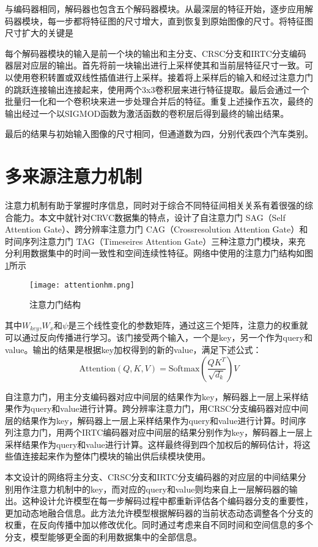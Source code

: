 与编码器相同，解码器也包含五个解码器模块。从最深层的特征开始，逐步应用解码器模块，每一步都将特征图的尺寸增大，直到恢复到原始图像的尺寸。将特征图尺寸扩大的关键是

每个解码器模块的输入是前一个块的输出和主分支、CRSC分支和IRTC分支编码器层对应层的输出。首先将前一块输出进行上采样使其和当前层特征尺寸一致。可以使用卷积转置或双线性插值进行上采样。接着将上采样后的输入和经过注意力门的跳跃连接输出连接起来，使用两个3x3卷积层来进行特征提取。最后会通过一个批量归一化和一个卷积块来进一步处理合并后的特征。重复上述操作五次，最终的输出经过一个以SIGMOD函数为激活函数的卷积层后得到最终的输出结果。

最后的结果与初始输入图像的尺寸相同，但通道数为四，分别代表四个汽车类别。

\section{多来源注意力机制}
注意力机制有助于掌握时序信息，同时对于综合不同特征间相关关系有着很强的综合能力。本文中就针对CRVC数据集的特点，设计了自注意力门 SAG（Self Attention Gate）、跨分辨率注意力门 CAG（Crossresolution Attention Gate）和时间序列注意力门 TAG（Timeseires Attention Gate）三种注意力门模块，来充分利用数据集中的时间一致性和空间连续性特征。网络中使用的注意力门结构如图\ref{fig:ag}所示
\begin{figure}[h]
    \centering
    \texttt{[image: attentionhm.png]}
    \caption{注意力门结构}
    \label{fig:ag}
  \end{figure}

其中\(W_{key}\),\(W_x\)和\(\psi\)是三个线性变化的参数矩阵，通过这三个矩阵，注意力的权重就可以通过反向传播进行学习。该门接受两个输入，一个是key，另一个作为query和value。输出的结果是根据key加权得到的新的value，满足下述公式：
\begin{equation}
\text{Attention}(Q, K, V) = \text{Softmax}\left(\frac{QK^T}{\sqrt{d_k}}\right)V 
\end{equation}

自注意力门，用主分支编码器对应中间层的结果作为key，解码器上一层上采样结果作为query和value进行计算。跨分辨率注意力门，用CRSC分支编码器对应中间层的结果作为key，解码器上一层上采样结果作为query和value进行计算。时间序列注意力门，用两个IRTC编码器对应中间层的结果分别作为key，解码器上一层上采样结果作为query和value进行计算。这样最终得到四个加权后的解码估计，将这些值连接起来作为整体门模块的输出供后续模块使用。

本文设计的网络将主分支、CRSC分支和IRTC分支编码器的对应层的中间结果分别用作注意力机制中的key，而对应的query和value则均来自上一层解码器的输出。这种设计允许模型在每一步解码过程中都重新评估各个编码器分支的重要性，更加动态地融合信息。此方法允许模型根据解码器的当前状态动态调整各个分支的权重，在反向传播中加以修改优化。同时通过考虑来自不同时间和空间信息的多个分支，模型能够更全面的利用数据集中的全部信息。


